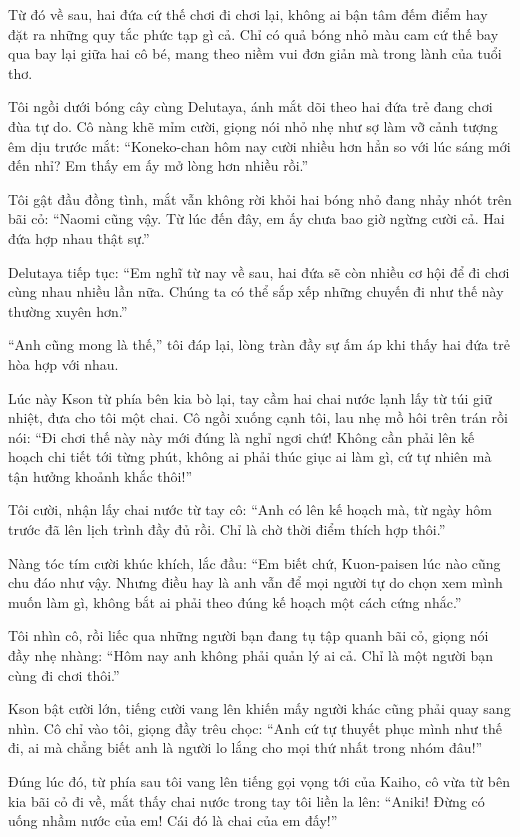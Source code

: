 ﻿\documentclass[../main.tex]{subfiles}
\begin{document}
Từ đó về sau, hai đứa cứ thế chơi đi chơi lại, không ai bận tâm đếm điểm hay đặt ra những quy tắc phức tạp gì cả. Chỉ có quả bóng nhỏ màu cam cứ thế bay qua bay lại giữa hai cô bé, mang theo niềm vui đơn giản mà trong lành của tuổi thơ.

Tôi ngồi dưới bóng cây cùng Delutaya, ánh mắt dõi theo hai đứa trẻ đang chơi đùa tự do. Cô nàng khẽ mỉm cười, giọng nói nhỏ nhẹ như sợ làm vỡ cảnh tượng êm dịu trước mắt: ``Koneko-chan hôm nay cười nhiều hơn hẳn so với lúc sáng mới đến nhỉ? Em thấy em ấy mở lòng hơn nhiều rồi.''

Tôi gật đầu đồng tình, mắt vẫn không rời khỏi hai bóng nhỏ đang nhảy nhót trên bãi cỏ: ``Naomi cũng vậy. Từ lúc đến đây, em ấy chưa bao giờ ngừng cười cả. Hai đứa hợp nhau thật sự.''

Delutaya tiếp tục: ``Em nghĩ từ nay về sau, hai đứa sẽ còn nhiều cơ hội để đi chơi cùng nhau nhiều lần nữa. Chúng ta có thể sắp xếp những chuyến đi như thế này thường xuyên hơn.''

``Anh cũng mong là thế,'' tôi đáp lại, lòng tràn đầy sự ấm áp khi thấy hai đứa trẻ hòa hợp với nhau.

Lúc này Kson từ phía bên kia bò lại, tay cầm hai chai nước lạnh lấy từ túi giữ nhiệt, đưa cho tôi một chai. Cô ngồi xuống cạnh tôi, lau nhẹ mồ hôi trên trán rồi nói: ``Đi chơi thế này này mới đúng là nghỉ ngơi chứ! Không cần phải lên kế hoạch chi tiết tới từng phút, không ai phải thúc giục ai làm gì, cứ tự nhiên mà tận hưởng khoảnh khắc thôi!''

Tôi cười, nhận lấy chai nước từ tay cô: ``Anh có lên kế hoạch mà, từ ngày hôm trước đã lên lịch trình đầy đủ rồi. Chỉ là chờ thời điểm thích hợp thôi.''

Nàng tóc tím cười khúc khích, lắc đầu: ``Em biết chứ, Kuon-paisen lúc nào cũng chu đáo như vậy. Nhưng điều hay là anh vẫn để mọi người tự do chọn xem mình muốn làm gì, không bắt ai phải theo đúng kế hoạch một cách cứng nhắc.''

Tôi nhìn cô, rồi liếc qua những người bạn đang tụ tập quanh bãi cỏ, giọng nói đầy nhẹ nhàng: ``Hôm nay anh không phải quản lý ai cả. Chỉ là một người bạn cùng đi chơi thôi.''

Kson bật cười lớn, tiếng cười vang lên khiến mấy người khác cũng phải quay sang nhìn. Cô chỉ vào tôi, giọng đầy trêu chọc: ``Anh cứ tự thuyết phục mình như thế đi, ai mà chẳng biết anh là người lo lắng cho mọi thứ nhất trong nhóm đâu!''

Đúng lúc đó, từ phía sau tôi vang lên tiếng gọi vọng tới của Kaiho, cô vừa từ bên kia bãi cỏ đi về, mắt thấy chai nước trong tay tôi liền la lên: ``Aniki! Đừng có uống nhầm nước của em! Cái đó là chai của em đấy!''
\end{document}
